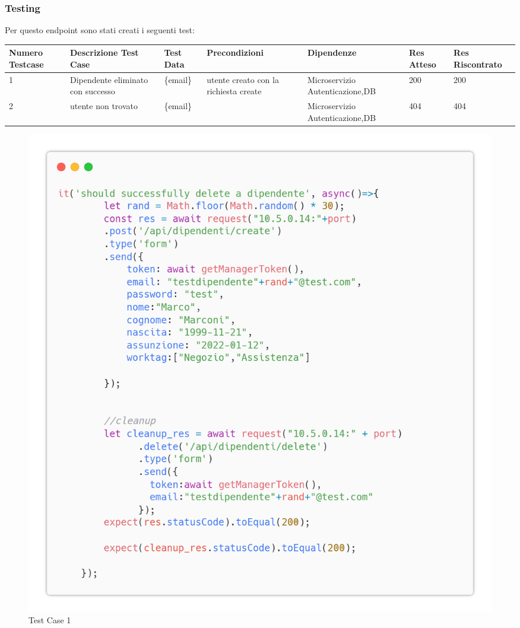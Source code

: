 \documentclass{report}
\begin{document}
\subsubsection*{Testing}
Per questo endpoint sono stati creati i seguenti test:
\begin{center} %
	\centering
	\begin{tabular}{ |p{1cm}|p{2cm}|p{2cm}|p{2cm}|p{2cm}|p{1cm}|p{1cm}| }
		\hline
		Numero Testcase & Descrizione Test Case & Test Data                   & Precondizioni                                          & Dipendenze & Res Atteso & Res Riscontrato \\
		\hline
		1               & Dipendente eliminato con successo    & \{email\}  & utente  creato con la richiesta create &  Microservizio Autenticazione,DB         & 200        & 200             \\
		\hline
		2               & utente non trovato  & \{email\}  &  &  Microservizio Autenticazione,DB         & 404        & 404           \\
		\hline
		
	\end{tabular}
\end{center}
\begin{figure}[H]
	\centering\includegraphics[width=1\textwidth]{images/microservizio-dipendenti/tests/delete_test_1.png}
	\caption{Test Case 1}
\end{figure}
\end{document}
